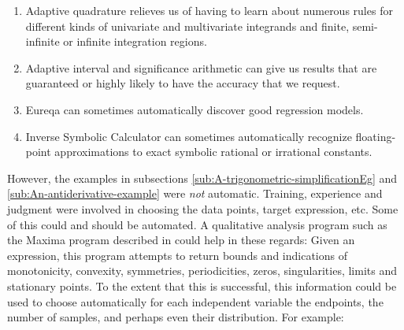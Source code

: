 \documentclass[12pt,english]{article}
\begin{document}
\begin{enumerate}
\item Adaptive quadrature relieves us of having to learn about numerous
rules for different kinds of univariate and multivariate integrands
and finite, semi-infinite or infinite integration regions.\vspace{-5pt}

\item Adaptive interval and significance arithmetic can give us results
that are guaranteed or highly likely to have the accuracy that we
request.\vspace{-5pt}

\item Eureqa can sometimes automatically discover good regression models.\vspace{-5pt}

\item Inverse Symbolic Calculator can sometimes automatically recognize
floating-point approximations to exact symbolic rational or irrational
constants.\vspace{-5pt}

\end{enumerate}
However, the examples in subsections \ref{sub:A-trigonometric-simplificationEg}
and \ref{sub:An-antiderivative-example} were \textsl{not} automatic.
Training, experience and judgment were involved in choosing the data
points, target expression, etc. Some of this could and should be automated.
A qualitative analysis program such as the Maxima program described
in \cite{QualitativeAnalysis} could help in these regards: Given
an expression, this program attempts to return bounds and indications
of monotonicity, convexity, symmetries, periodicities, zeros, singularities,
limits and stationary points. To the extent that this is successful,
this information could be used to choose automatically for each independent
variable the endpoints, the number of samples, and perhaps even their
distribution. For example:\vspace{-5pt}
\end{document}
